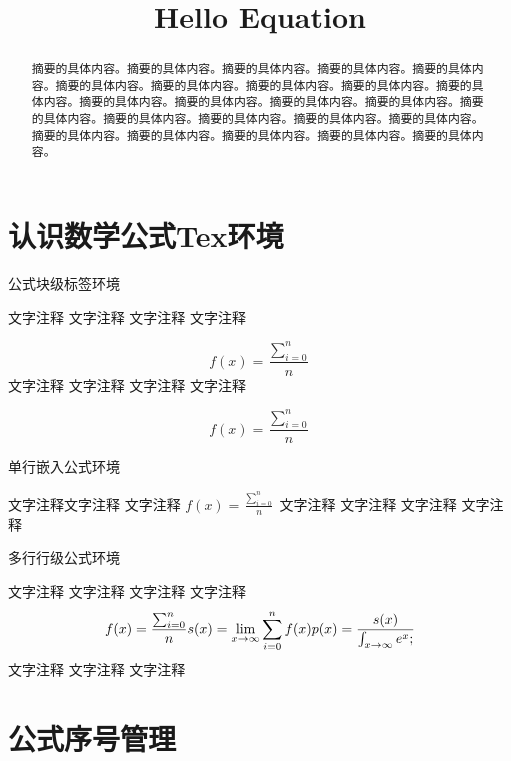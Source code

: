 \documentclass[withoutpreface,bwprint]{cumcmthesis}  %
\title{Hello Equation}
\begin{document}
	\maketitle %
	\begin{abstract}
		摘要的具体内容。摘要的具体内容。摘要的具体内容。摘要的具体内容。摘要的具体内容。摘要的具体内容。摘要的具体内容。摘要的具体内容。摘要的具体内容。摘要的具体内容。摘要的具体内容。摘要的具体内容。摘要的具体内容。摘要的具体内容。摘要的具体内容。摘要的具体内容。摘要的具体内容。摘要的具体内容。摘要的具体内容。摘要的具体内容。摘要的具体内容。摘要的具体内容。摘要的具体内容。摘要的具体内容。
	\end{abstract}
	\newpage
	
\section{认识数学公式Tex环境}
	
\noindent 公式块级标签环境


文字注释 文字注释 文字注释 文字注释 



	\begin{equation}
			f(x)= \frac{\sum_{i=0}^{n}}{n} 
	\end{equation}
文字注释 文字注释 文字注释 文字注释 


	\begin{equation*}
		f(x)= \frac{\sum_{i=0}^{n}}{n} 
	\end{equation*}

\noindent 单行嵌入公式环境



文字注释文字注释 文字注释    $ f(x)= \frac{\sum_{i=0}^{n}}{n} $ 文字注释 文字注释 文字注释 文字注释 

\noindent 多行行级公式环境 

文字注释 文字注释 文字注释 文字注释 
$$
  	 f(x)= \frac{\sum_{i=0}^{n}}{n} \\
		s(x)= \lim_{x\rightarrow\infty}\sum_{i=0}^{n}f(x)\\
		p(x)= \frac{s(x)}{\int_{x\rightarrow\infty}e^{x};}
$$
文字注释 文字注释 文字注释 

\section{公式序号管理}
\end{document}
